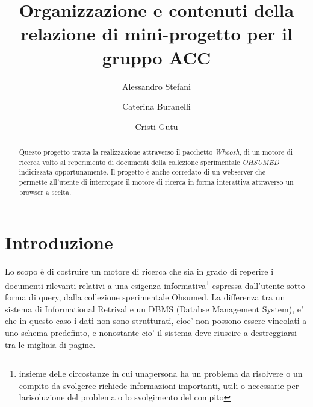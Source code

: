 \documentclass[runningheads]{llncs}
\begin{document}
%
\title{Organizzazione e contenuti della relazione di mini-progetto per il gruppo ACC}
%
%
\author{%
  Alessandro Stefani \and
  Caterina Buranelli \and
  Cristi Gutu}
%
%
%
\maketitle
%
\begin{abstract}
Questo progetto tratta la realizzazione attraverso il pacchetto \emph{Whoosh}, di un motore di ricerca
volto al reperimento di documenti della collezione sperimentale \emph{OHSUMED} indicizzata opportunamente.
Il progetto è anche corredato di un webserver che permette all'utente di interrogare il motore di ricerca
in forma interattiva attraverso un browser a scelta.
\end{abstract}

\section{Introduzione}
\label{sec:introduzione}

Lo scopo è di costruire un motore di ricerca che sia in grado di reperire i documenti rilevanti relativi a una esigenza informativa\footnote{insieme delle circostanze in cui unapersona ha un problema da risolvere o un compito da svolgeree richiede informazioni importanti, utili o necessarie per larisoluzione del problema o lo svolgimento del compito}
espressa dall'utente sotto forma di query, dalla collezione sperimentale Ohsumed.
La differenza tra un sistema di Informational Retrival e un DBMS (Databse Management System), e' che in questo caso i dati non sono strutturati, cioe' non possono essere vincolati a uno schema predefinto, e nonostante cio' il sistema deve riuscire a destreggiarsi tra le migliaia di pagine.
\end{document}
